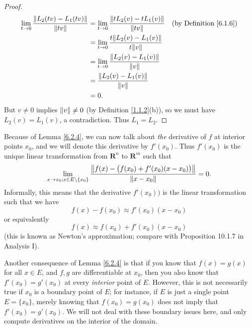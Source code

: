 \begin{proof}
\begin{align*}
        \lim_{t \to 0} \frac{\norm*{L_2(tv) - L_1(tv)}}{\norm*{tv}} & = \lim_{t \to 0} \frac{\norm*{t L_2(v) - t L_1(v)}}{\norm*{tv}} & \text{(by Definition \ref{6.1.6})} \\
                                                                    & = \lim_{t \to 0} \frac{t \norm*{L_2(v) - L_1(v)}}{t \norm*{v}}                                       \\
                                                                    & = \lim_{t \to 0} \frac{\norm*{L_2(v) - L_1(v)}}{\norm*{v}}                                           \\
                                                                    & = \frac{\norm*{L_2(v) - L_1(v)}}{\norm*{v}}                                                          \\
                                                                    & = 0.
    \end{align*}
    But \(v \neq 0\) implies \(\norm*{v} \neq 0\) (by Definition \ref{1.1.2}(b)), so we must have \(L_2(v) = L_1(v)\), a contradiction.
    Thus \(L_1 = L_2\).
\end{proof}

\begin{note}
    Because of Lemma \ref{6.2.4}, we can now talk about \emph{the} derivative of \(f\) at interior points \(x_0\), and we will denote this derivative by \(f'(x_0)\).
    Thus \(f'(x_0)\) is the unique linear transformation from \(\mathbf{R}^n\) to \(\mathbf{R}^m\) such that
    \[
        \lim_{x \to x_0 ; x \in E \setminus \{x_0\}} \frac{\norm*{f(x) - \big(f(x_0) + f'(x_0)(x - x_0)\big)}}{\norm*{x - x_0}} = 0.
    \]
    Informally, this means that the derivative \(f'(x_0))\) is the linear transformation such that we have
    \[
        f(x) - f(x_0) \approx f'(x_0)(x - x_0)
    \]
    or equivalently
    \[
        f(x) \approx f(x_0) + f'(x_0)(x - x_0)
    \]
    (this is known as Newton's approximation;
    compare with Proposition 10.1.7 in Analysis I).
\end{note}

\begin{note}
    Another consequence of Lemma \ref{6.2.4} is that if you know that \(f(x) = g(x)\) for all \(x \in E\), and \(f, g\) are differentiable at \(x_0\), then you also know that \(f'(x_0) = g'(x_0)\) at every \emph{interior} point of \(E\).
    However, this is not necessarily true if \(x_0\) is a boundary point of \(E\);
    for instance, if \(E\) is just a single point \(E = \{x_0\}\), merely knowing that \(f(x_0) = g(x_0)\) does not imply that \(f'(x_0) = g'(x_0)\).
    We will not deal with these boundary issues here, and only compute derivatives on the interior of the domain.
\end{note}

